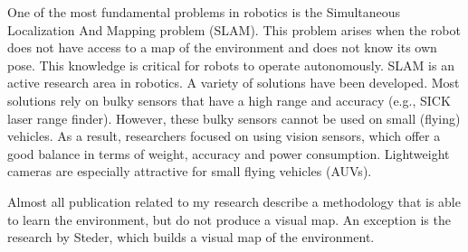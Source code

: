 One of the most fundamental problems in robotics is the Simultaneous Localization And Mapping problem (SLAM).
This problem arises when the robot does not have access to a map of the environment and does not know its own pose. 
This knowledge is critical for robots to operate autonomously.
SLAM is an active research area in robotics.
A variety of solutions have been developed.
Most solutions rely on bulky sensors that have a high range and accuracy (e.g., SICK laser range finder).
However, these bulky sensors cannot be used on small (flying) vehicles.
As a result, researchers focused on using vision sensors, which offer a good balance in terms of weight, accuracy and power consumption.
Lightweight cameras are especially attractive for small flying vehicles (AUVs).

Almost all publication related to my research describe a methodology that is able to learn the environment, but do not produce a visual map.
An exception is the research by Steder, which builds a visual map of the environment.

